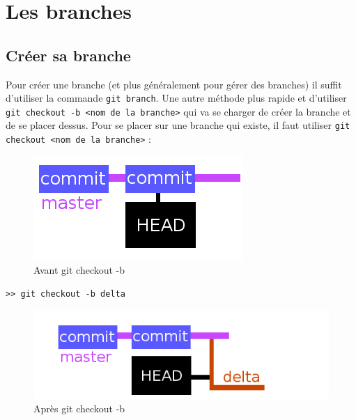 \documentclass[a4paper,10pt]{report}
\begin{document}
  \section{Les branches}
     \subsection{Cr\'eer sa branche}
     Pour cr\'eer une branche (et plus g\'en\'eralement pour g\'erer des branches) il suffit d'utiliser la commande \verb|git branch|. Une autre m\'ethode plus rapide et d'utiliser \verb|git checkout -b <nom de la branche>| qui va se charger de cr\'eer la branche et de se placer dessus. Pour se placer sur une branche qui existe, il faut utiliser \verb|git checkout <nom de la branche>| :
\begin{figure}[h!]
  \begin{center}
    \includegraphics[scale=0.3]{images/prebranch}
    \caption{Avant git checkout -b}
    \label{obprebranch}
  \end{center}
\end{figure}
\begin{verbatim}
>> git checkout -b delta
\end{verbatim}
\begin{figure}[h!]
  \begin{center}
    \includegraphics[scale=0.3]{images/afterbranch}
    \caption{Apr\`es git checkout -b}
    \label{obpostbranch}
  \end{center}
\end{figure}
\end{document}
